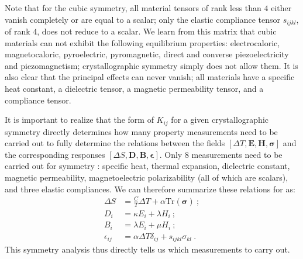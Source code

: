 Note that for the cubic symmetry, all material tensors of rank less than $4$ either vanish completely or are equal to a scalar; only the elastic compliance tensor $s_{ijkl}$, of rank $4$, does not reduce to a scalar.  We learn from this matrix that cubic materials can not exhibit the following equilibrium properties: electrocaloric, magnetocaloric, pyroelectric, pyromagnetic, direct and converse piezoelectricity and piezomagnetism; crystallographic symmetry simply does not allow them. It is also clear that the principal effects can never vanish; all materials have a specific heat constant, a dielectric tensor, a magnetic permeability tensor, and a compliance tensor.  

It is important to realize that the form of $K_{ij}$ for a given crystallographic symmetry directly determines how many property measurements need to be carried out to fully determine the relations between the fields $[\Delta T, \mathbf{E}, \mathbf{H}, \bm{\sigma}]$ and the corresponding responses $[\Delta S, \mathbf{D}, \mathbf{B}, \bm{\epsilon}]$. Only $8$ measurements need to be carried out for symmetry : specific heat, thermal expansion, dielectric constant, magnetic permeability, magnetoelectric polarizability (all of which are scalars), and three elastic compliances.  We can therefore summarize these relations for  as:
\begin{align}
	\Delta S &= \frac{C}{T}\Delta T + \alpha \text{Tr}(\bm{\sigma})\ ;\\
	D_i &=  \kappa E_i + \lambda H_i\ ;\\
	B_i &=  \lambda E_i + \mu H_i\ ;\\
	\epsilon_{ij} &= \alpha\Delta T\delta_{ij} + s_{ijkl}\sigma_{kl}\ .
\end{align}
This symmetry analysis thus directly tells us which measurements to carry out.

